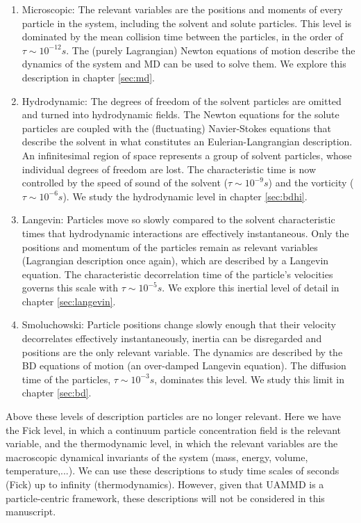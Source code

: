 \documentclass[ twoside,openright,titlepage,numbers=noenddot,%
headinclude,footinclude,cleardoublepage=empty,abstract=on,
BCOR=5mm,paper=a4,fontsize=11pt, dvipsnames
]{scrreprt}
\newcommand{\uammd}{\gls{UAMMD}\xspace}
\begin{document}
\begin{enumerate}
\item Microscopic: The relevant variables are the positions and moments of every particle in the system, including the solvent and solute particles. This level is dominated by the mean collision time between the particles, in the order of $\tau \sim 10^{-12} s$. The (purely Lagrangian) Newton equations of motion describe the dynamics of the system and \gls{MD} can be used to solve them. We explore this description in chapter \ref{sec:md}.
\item Hydrodynamic: The degrees of freedom of the solvent particles are omitted and turned into hydrodynamic fields. The Newton equations for the solute particles are coupled with the (fluctuating) Navier-Stokes equations that describe the solvent in what constitutes an Eulerian-Langrangian description. An infinitesimal region of space represents a group of solvent particles, whose individual degrees of freedom are lost. The characteristic time is now controlled by the speed of sound of the solvent ($\tau \sim 10^{-9}s$) and the vorticity ($\tau \sim 10^{-6}s$). We study the hydrodynamic level in chapter \ref{sec:bdhi}.
\item Langevin: Particles move so slowly compared to the solvent characteristic times that hydrodynamic interactions are effectively instantaneous. Only the positions and momentum of the particles remain as relevant variables (Lagrangian description once again), which are described by a Langevin equation. The characteristic decorrelation time of the particle's velocities governs this scale with $\tau\sim 10^{-5}s$. We explore this inertial level of detail in chapter \ref{sec:langevin}.
\item Smoluchowski: Particle positions change slowly enough that their velocity decorrelates effectively instantaneously, inertia can be disregarded and positions are the only relevant variable. The dynamics are described by the \gls{BD} equations of motion (an over-damped Langevin equation). The diffusion time of the particles, $\tau \sim 10^{-3} s$, dominates this level. We study this limit in chapter \ref{sec:bd}.
\end{enumerate}
Above these levels of description particles are no longer relevant. Here we have the Fick level, in which a continuum particle concentration field is the relevant variable, and the thermodynamic level, in which the relevant variables are the macroscopic dynamical invariants of the system (mass, energy, volume, temperature,...). We can use these descriptions to study time scales of seconds (Fick) up to infinity (thermodynamics). However, given that \uammd is a particle-centric framework, these descriptions will not be considered in this manuscript.
\end{document}
